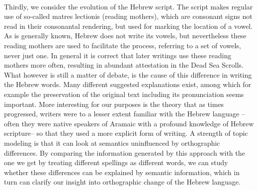 \documentclass[10pt,a4paper]{article}
\begin{document}
\\Thirdly, we consider the evolution of the Hebrew script. The script makes regular use of so-called matres lectionis (reading mothers), which are consonant signs not read in their consonantal rendering, but used for marking the location of a vowel. As is generally known, Hebrew does not write its vowels, but nevertheless these reading mothers are used to facilitate the process, referring to a set of vowels, never just one. In general it is correct that later writings use these reading mothers more often, resulting in abundant attestation in the Dead Sea Scrolls. What however is still a matter of debate, is the cause of this difference in writing the Hebrew words. Many different suggested explanations exist, among which for example the preservation of the original text including its pronunciation seems important. More interesting for our purposes is the theory that as times progressed, writers were to a lesser extent familiar with the Hebrew language –often they were native speakers of Aramaic with a profound knowledge of Hebrew scripture– so that they used a more explicit form of writing. A strength of topic modeling is that it can look at semantics uninfluenced by orthographic differences. By comparing the information generated by this approach with the one we get by treating different spellings as different words, we can study whether these differences can be explained by semantic information, which in turn can clarify our insight into orthographic change of the Hebrew language.


 
\end{document}
